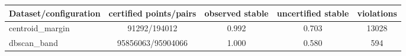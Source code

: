 \begin{tabular}{lcccc}
\toprule
Dataset/configuration & certified points/pairs & observed stable & uncertified stable & violations \\
\midrule
centroid\_margin & 91292/194012 & 0.992 & 0.703 & 13028 \\
dbscan\_band & 95856063/95904066 & 1.000 & 0.580 & 594 \\
\bottomrule
\end{tabular}
